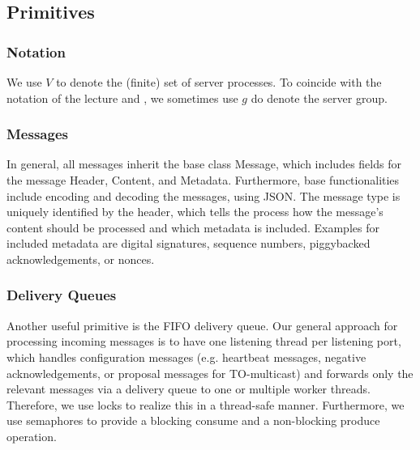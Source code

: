 \documentclass[runningheads]{llncs}
\begin{document}
\subsection{Primitives} \label{sec:primitives}

\subsubsection{Notation} We use $V$ to denote the (finite) set of server processes. To coincide with the notation of the lecture and \cite{ds_book}, we sometimes use $g$ do denote the server group.

\subsubsection{Messages}
In general, all messages inherit the base class \textsf{Message}, which includes fields for the message \textsf{Header}, \textsf{Content}, and \textsf{Metadata}. Furthermore, base functionalities include encoding and decoding the messages, using JSON. The message type is uniquely identified by the header, which tells the process how the message's content should be processed and which metadata is included. Examples for included metadata are digital signatures, sequence numbers, piggybacked acknowledgements, or nonces.

\subsubsection{Delivery Queues}
Another useful primitive is the FIFO delivery queue. Our general approach for processing incoming messages is to have one listening thread per listening port, which handles configuration messages (e.g. heartbeat messages, negative acknowledgements, or proposal messages for TO-multicast) and forwards only the relevant messages via a delivery queue to one or multiple worker threads. Therefore, we use locks to realize this in a thread-safe manner. Furthermore, we use semaphores to provide a blocking consume and a non-blocking produce operation. 
\end{document}

